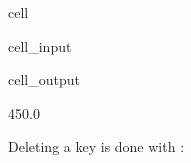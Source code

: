 \documentclass[letterpaper,10pt,english]{jupyterBook}
\begin{document}
\begin{sphinxuseclass}{cell}\begin{sphinxVerbatimInput}

\begin{sphinxuseclass}{cell_input}
\begin{sphinxVerbatim}[commandchars=\\\{\}]
\PYG{p}{[}\PYG{p}{]}
\end{sphinxVerbatim}

\end{sphinxuseclass}\end{sphinxVerbatimInput}
\begin{sphinxVerbatimOutput}

\begin{sphinxuseclass}{cell_output}
\begin{sphinxVerbatim}[commandchars=\\\{\}]
450.0
\end{sphinxVerbatim}

\end{sphinxuseclass}\end{sphinxVerbatimOutput}

\end{sphinxuseclass}
\sphinxAtStartPar
Deleting a key is done with :
\end{document}
